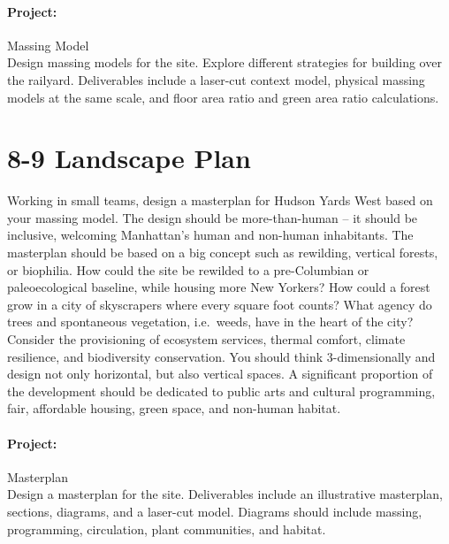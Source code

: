 \documentclass[11pt,article,oneside]{memoir}
\begin{document}
\paragraph{Project:} Massing Model \\

\noindent
Design massing models for the site. Explore different strategies for building over the railyard. Deliverables include a laser-cut context model, physical massing models at the same scale, and floor area ratio and green area ratio calculations. 


\section{8-9 Landscape Plan}

Working in small teams, design a masterplan for Hudson Yards West based on your massing model. The design should be more-than-human -- it should be inclusive, welcoming Manhattan's human and non-human inhabitants.  The masterplan should be based on a big concept such as rewilding, vertical forests, or biophilia. How could the site be rewilded to a pre-Columbian or paleoecological baseline, while housing more New Yorkers? How could a forest grow in a city of skyscrapers where every square foot counts? What agency do trees and spontaneous vegetation, i.e.~weeds, have in the heart of the city? Consider the provisioning of ecosystem services, thermal comfort, climate resilience, and biodiversity conservation. You should think 3-dimensionally and design not only horizontal, but also vertical spaces. A significant proportion of the development should be dedicated to public arts and cultural programming, fair, affordable housing, green space, and non-human habitat. 

\paragraph{Project:} Masterplan \\

\noindent
Design a masterplan for the site. Deliverables include an illustrative masterplan, sections, diagrams, and a laser-cut model. Diagrams should include massing, programming, circulation, plant communities, and habitat.

\end{document}
